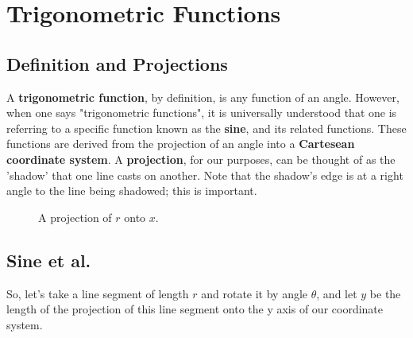 \section{Trigonometric Functions}

\subsection{Definition and Projections}

A {\bf trigonometric function}, by definition, is any function of an angle.  However, when one says "trigonometric functions", it is universally understood that one is referring to a specific function known as the {\bf sine}, and its related functions.  These functions are derived from the projection of an angle into a {\bf Cartesean coordinate system}.  A {\bf projection}, for our purposes, can be thought of as the 'shadow' that one line casts on another.  Note that the shadow's edge is at a right angle to the line being shadowed; this is important.\\

\begin{figure}[htb]
\center
\caption{A projection of $r$ onto $x$.}
\label{fig:projection}
\end{figure}


\subsection{Sine et al.}

So, let's take a line segment of length $r$ and rotate it by angle $\theta$, and let $y$ be the length of the projection of this line segment onto the y axis of our coordinate system.\\

